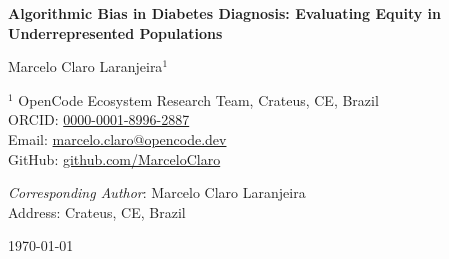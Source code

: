 
\begin{center}
{\Large\bfseries Algorithmic Bias in Diabetes Diagnosis: 
Evaluating Equity in Underrepresented Populations\vspace{0.5cm}}

{\large Marcelo Claro Laranjeira$^{1}$\vspace{0.3cm}}

{\small 
$^{1}$ OpenCode Ecosystem Research Team, Crateus, CE, Brazil\\
ORCID: \href{https://orcid.org/0000-0001-8996-2887}{0000-0001-8996-2887}\\
Email: \href{mailto:marcelo.claro@opencode.dev}{marcelo.claro@opencode.dev}\\
GitHub: \href{https://github.com/MarceloClaro}{github.com/MarceloClaro}
}
\vspace{0.3cm}

{\small \textit{Corresponding Author}: Marcelo Claro Laranjeira\\
{\small Address: Crateus, CE, Brazil}}
\vspace{0.3cm}

{\small \today}
\end{center}
